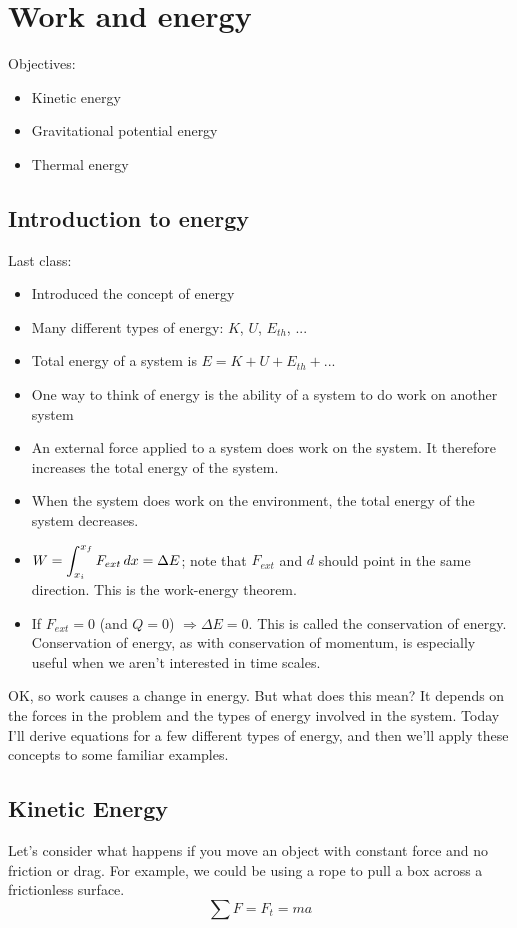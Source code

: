 \section{Work and energy}
Objectives:
\begin{itemize}
\item Kinetic energy
\item Gravitational potential energy
\item Thermal energy
\end{itemize}

\hrulefill

\subsection{Introduction to energy}
Last class:
\begin{itemize}
\item Introduced the concept of energy
\item Many different types of energy: $K$, $U$, $E_{th}$, $...$
\item Total energy of a system is $E=K+U+E_{th}+...$
\item One way to think of energy is the ability of a system to do work on another system
\item An external force applied to a system does work on the system. It therefore increases the total energy of the system.
\item When the system does work on the environment, the total energy of the system decreases.
\item $W=\displaystyle\int_{x_i}^{x_f}F_{ext}\,dx=\Delta{E}$; note that $F_{ext}$ and $d$ should point in the same direction. This is the work-energy theorem.
\item If $F_{ext}=0$ (and $Q=0$) $\Rightarrow \Delta{E}=0$. This is called the conservation of energy. Conservation of energy, as with conservation of momentum, is especially useful when we aren't interested in time scales.
\end{itemize}

OK, so work causes a change in energy. But what does this mean? It depends on the forces in the problem and the types of energy involved in the system. Today I'll derive equations for a few different types of energy, and then we'll apply these concepts to some familiar examples.

\subsection{Kinetic Energy}
Let's consider what happens if you move an object with constant force and no friction or drag. For example, we could be using a rope to pull a box across a frictionless surface.
$$\sum F=F_t=ma$$

